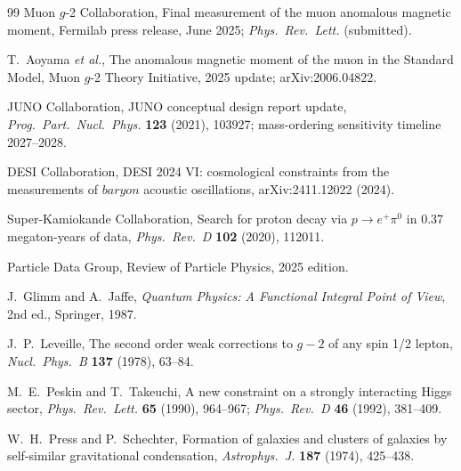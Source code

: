 \begin{thebibliography}{99}
Muon $g$-2 Collaboration,
Final measurement of the muon anomalous magnetic moment,
Fermilab press release, June 2025;
\emph{Phys.\ Rev.\ Lett.} (submitted).

T.~Aoyama \emph{et al.},
The anomalous magnetic moment of the muon in the Standard Model,
Muon $g$-2 Theory Initiative, 2025 update;
arXiv:2006.04822.

JUNO Collaboration,
JUNO conceptual design report update,
\emph{Prog.\ Part.\ Nucl.\ Phys.} \textbf{123} (2021), 103927;
mass-ordering sensitivity timeline 2027--2028.

DESI Collaboration,
DESI 2024 VI: cosmological constraints from the measurements of
$baryon$ acoustic oscillations,
arXiv:2411.12022 (2024).

Super-Kamiokande Collaboration,
Search for proton decay via $p\to e^+\pi^0$ in 0.37 megaton-years of data,
\emph{Phys.\ Rev.\ D} \textbf{102} (2020), 112011.

Particle Data Group,
Review of Particle Physics, 2025 edition.

J.~Glimm and A.~Jaffe,
\emph{Quantum Physics: A Functional Integral Point of View},
2nd ed., Springer, 1987.

J.~P.~Leveille,
The second order weak corrections to $g-2$ of any spin 1/2 lepton,
\emph{Nucl.\ Phys.\ B} \textbf{137} (1978), 63--84.

M.~E.~Peskin and T.~Takeuchi,
A new constraint on a strongly interacting Higgs sector,
\emph{Phys.\ Rev.\ Lett.} \textbf{65} (1990), 964--967;
\emph{Phys.\ Rev.\ D} \textbf{46} (1992), 381--409.

W.~H.~Press and P.~Schechter,
Formation of galaxies and clusters of galaxies by self-similar gravitational
condensation,
\emph{Astrophys.\ J.} \textbf{187} (1974), 425--438.

\end{thebibliography}
